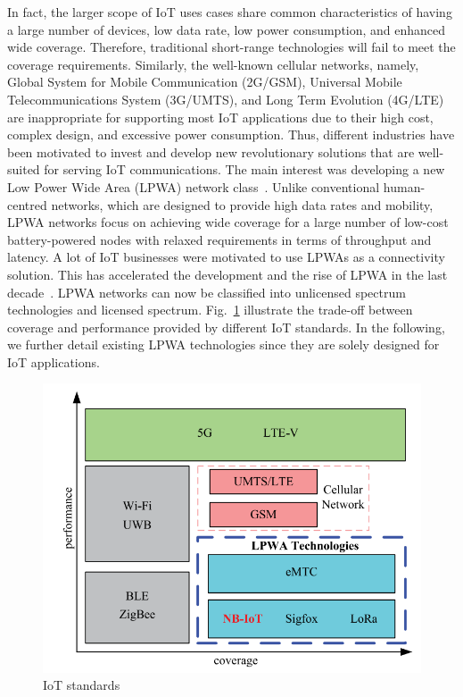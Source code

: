 \documentclass[]{IEEEtran}
\begin{document}
In fact, the larger scope of IoT uses cases share common characteristics of having a large number of devices, low data rate, low power consumption, and enhanced wide coverage.
Therefore, traditional short-range technologies will fail to meet the coverage requirements.
Similarly, the well-known cellular networks, namely, Global System for Mobile Communication (2G/GSM), Universal Mobile Telecommunications System (3G/UMTS), and Long Term Evolution (4G/LTE) are inappropriate for supporting most IoT applications due to their high cost, complex design, and excessive power consumption.
Thus, different industries have been motivated to invest and develop new revolutionary solutions that are well-suited for serving IoT communications.
The main interest was developing a new Low Power Wide Area (LPWA) network class~\cite{akpakwu2017survey}.
Unlike conventional human-centred networks, which are designed to provide high data rates and mobility, LPWA networks focus on achieving wide coverage for a large number of low-cost battery-powered nodes with relaxed requirements in terms of throughput and latency.
A lot of IoT businesses were motivated to use LPWAs as a connectivity solution.
This has accelerated the development and the rise of LPWA in the last decade~\cite{hwang_survey_2019}.
LPWA networks can now be classified into unlicensed spectrum technologies and licensed spectrum.
Fig.~\ref{fig:nb-iot} illustrate the trade-off between coverage and performance provided by different IoT standards.
In the following, we further detail existing LPWA technologies since they are solely designed for IoT applications.~

\begin{figure}
    \centering
    \includegraphics[width=\linewidth]{Pictures/NB-IoT example.png}
    \caption{IoT standards}
    \label{fig:nb-iot}
\end{figure}
\end{document}
